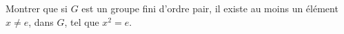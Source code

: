 Montrer que si $G$ est un groupe fini d'ordre pair, il existe au moins un élément $x \neq e$, dans $G$, tel que $x^2 = e$.